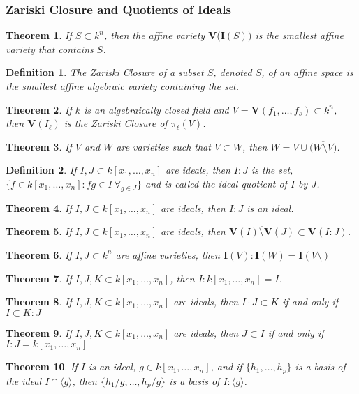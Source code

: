 \documentclass{article}
\theoremstyle{mystyle}
\newtheorem{theorem}{Theorem}[section]
\newtheorem{definition}{Definition}[section]
\begin{document}
\subsubsection{Zariski Closure and Quotients of Ideals}
\begin{theorem}
If $S\subset k^n$, then the affine variety $\mathbf{V}\big(\textbf{I}(S)\big)$ is the smallest affine variety that contains $S$.
\end{theorem}
\begin{definition}
The Zariski Closure of a subset $S$, denoted $\overline{S}$, of an affine space is the smallest affine algebraic variety containing the set. 
\end{definition}
\begin{theorem}
If $k$ is an algebraically closed field and $V = \mathbf{V}(f_1,\hdots, f_s)\subset k^n$, then $\mathbf{V}(I_{\ell})$ is the Zariski Closure of $\pi_{\ell}(V)$.
\end{theorem}
\begin{theorem}
If $V$ and $W$ are varieties such that $V\subset W$, then $W = V\cup \overline{\big(W\setminus V\big)}$.
\end{theorem}
\begin{definition}
If $I,J\subset k[x_1,\hdots ,x_n]$ are ideals, then $I:J$ is the set, $\{f\in k[x_1,\hdots ,x_n]: fg \in I\ \forall_{g\in J}\}$ and is called the ideal quotient of $I$ by $J$.
\end{definition}
\begin{theorem}
If $I,J\subset k[x_1,\hdots ,x_n]$ are ideals, then $I:J$ is an ideal.
\end{theorem}
\begin{theorem}
If $I,J\subset k[x_1,\hdots ,x_n]$ are ideals, then $\overline{\mathbf{V}(I)\setminus \mathbf{V}(J)} \subset \mathbf{V}(I:J)$.
\end{theorem}
\begin{theorem}
If $I,J\subset k^n$ are affine varieties, then $\textbf{I}(V): \textbf{I}(W) = \textbf{I}(V\setminus)$
\end{theorem}
\begin{theorem}
If $I,J, K \subset k[x_1,\hdots ,x_n]$, then $I:k[x_1,\hdots ,x_n] = I$.
\end{theorem}
\begin{theorem}
If $I,J,K \subset k[x_1,\hdots ,x_n]$ are ideals, then $I\cdot J \subset K$ if and only if $I \subset K:J$
\end{theorem}
\begin{theorem}
If $I,J,K \subset k[x_1,\hdots ,x_n]$ are ideals, then $J\subset I$ if and only if $I:J = k[x_1,\hdots ,x_n]$
\end{theorem}
\begin{theorem}
If $I$ is an ideal, $g\in k[x_1,\hdots ,x_n]$, and if $\{h_1,\hdots, h_p\}$ is a basis of the ideal $I\cap \langle g \rangle$, then $\{h_1/g,\hdots, h_p/g\}$ is a basis of $I:\langle g\rangle$.
\end{theorem}
\end{document}
